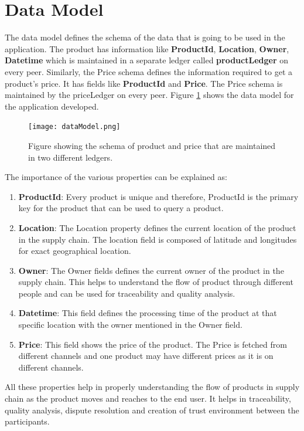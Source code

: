 \documentclass[
  a4paper,  %
  twoside,  %
  bibliography=totoc,
  headsepline,
  cleardoublepage=empty,
  parskip=half,
  draft=false
]{scrbook}
\begin{document}
\section{Data Model}
The data model defines the schema of the data that is going to be used in the application. The product has information like \textbf{ProductId}, \textbf{Location}, \textbf{Owner}, \textbf{Datetime} which is maintained in a separate ledger called \textbf{productLedger} on every peer. Similarly, the Price schema defines the information required to get a product's price. It has fields like \textbf{ProductId} and \textbf{Price}. The Price schema is maintained by the priceLedger on every peer. Figure \ref{fig:dm} shows the data model for the application developed.
\begin{figure}[h!]
\begin{center}
\texttt{[image: dataModel.png]}
\caption{Figure showing the schema of product and price that are maintained in two different ledgers.}
\label{fig:dm}
\end{center}
\end{figure}
The importance of the various properties can be explained as:
\begin{enumerate}
    \item \textbf{ProductId}: Every product is unique and therefore, ProductId is the primary key for the product that can be used to query a product.
    \item \textbf{Location}: The Location property defines the current location of the product in the supply chain. The location field is composed of latitude and longitudes for exact geographical location.
    \item \textbf{Owner}: The Owner fields defines the current owner of the product in the supply chain. This helps to understand the flow of product through different people and can be used for traceability and quality analysis.
    \item \textbf{Datetime}: This field defines the processing time of the product at that specific location with the owner mentioned in the Owner field.
    \item \textbf{Price}: This field shows the price of the product. The Price is fetched from different channels and one product may have different prices as it is on different channels.
\end{enumerate}
All these properties help in properly understanding the flow of products in supply chain as the product moves and reaches to the end user. It helps in traceability, quality analysis, dispute resolution and creation of trust environment between the participants.
\end{document}
